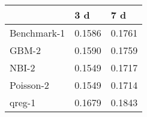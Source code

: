 \begin{tabular}{lll}
\toprule
 & 3 d & 7 d \\
\midrule
Benchmark-1 & 0.1586 & 0.1761 \\
GBM-2 & 0.1590 & 0.1759 \\
NBI-2 & 0.1549 & 0.1717 \\
Poisson-2 & 0.1549 & 0.1714 \\
qreg-1 & 0.1679 & 0.1843 \\
\bottomrule
\end{tabular}
